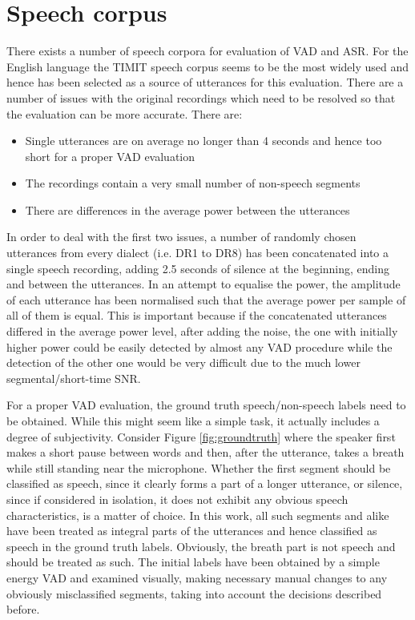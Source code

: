 
\section{Speech corpus}

There exists a number of speech corpora for evaluation of VAD and ASR. For the English language the TIMIT speech corpus \cite{TIMIT} seems to be the most widely used and hence has been selected as a source of utterances for this evaluation. There are a number of issues with the original recordings which need to be resolved so that the evaluation can be more accurate. There are:

\begin{itemize}
\item Single utterances are on average no longer than 4 seconds and hence too short for a proper VAD evaluation
\item The recordings contain a very small number of non-speech segments
\item There are differences in the average power between the utterances
\end{itemize}

In order to deal with the first two issues, a number of randomly chosen utterances from every dialect (i.e. DR1 to DR8) has been concatenated into a single speech recording, adding 2.5 seconds of silence at the beginning, ending and between the utterances. In an attempt to equalise the power, the amplitude of each utterance has been normalised such that the average power per sample of all of them is equal. This is important because if the concatenated utterances differed in the average power level, after adding the noise, the one with initially higher power could be easily detected by almost any VAD procedure while the detection of the other one would be very difficult due to the much lower segmental/short-time SNR.

For a proper VAD evaluation, the ground truth speech/non-speech labels need to be obtained. While this might seem like a simple task, it actually includes a degree of subjectivity. Consider Figure \ref{fig:groundtruth} where the speaker first makes a short pause between words and then, after the utterance, takes a breath while still standing near the microphone. Whether the first segment should be classified as speech, since it clearly forms a part of a longer utterance, or silence, since if considered in isolation, it does not exhibit any obvious speech characteristics, is a matter of choice. In this work, all such segments and alike have been treated as integral parts of the utterances and hence classified as speech in the ground truth labels. Obviously, the breath part is not speech and should be treated as such. The initial labels have been obtained by a simple energy VAD and examined visually, making necessary manual changes to any obviously misclassified segments, taking into account the decisions described before.

